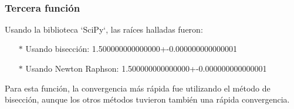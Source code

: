 \documentclass[titlepage,a4paper]{article}
\begin{document}
\\%

\subsubsection{Tercera función}\label{sec:CR3}

Usando la biblioteca `SciPy`, las raíces halladas fueron:
\begin{itemize}
    \item[$*$]Usando bisección:   1.500000000000000+-0.000000000000001
    \item[$*$]Usando Newton Raphson:  1.500000000000000+-0.000000000000001
\end{itemize}

Para esta función, la convergencia más rápida fue utilizando el método de bisección, aunque los otros métodos tuvieron también una rápida convergencia. 
\end{document}
